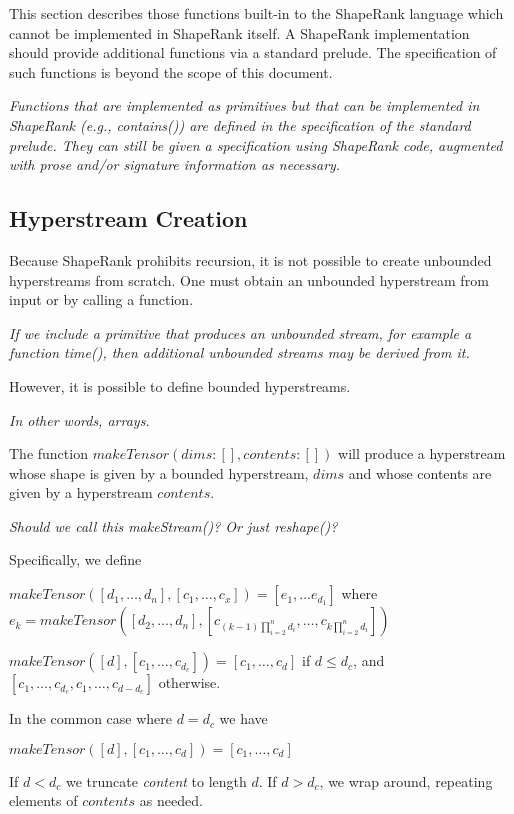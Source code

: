 \documentclass{article}
\begin{document}
This section describes those functions built-in to the ShapeRank language which cannot be implemented in ShapeRank itself. A ShapeRank implementation should provide additional functions via a standard prelude. The specification of such functions is beyond the scope of this document. 

{\em
Functions that are implemented as primitives but that can be implemented in
ShapeRank (e.g., contains()) are defined in the specification of the standard prelude. They can still be given a specification using ShapeRank code, augmented with prose
and/or signature information as necessary.
}

\subsection{Hyperstream Creation}
\label{streamCreation}

Because ShapeRank prohibits recursion, it is not possible to create unbounded hyperstreams from scratch. One must obtain an unbounded hyperstream from input or by calling a function.

{\em
If we include a primitive that produces an unbounded stream, for example a function {\em time()}, then additional
unbounded streams may be derived from it.
}

However, it is possible to define bounded hyperstreams.

{\em In other words, arrays.}

The function $makeTensor(dims: [], contents: [])$
will produce a hyperstream whose shape is given by a bounded hyperstream, $dims$ and whose contents are given by a hyperstream $contents$.

{\em
Should we call this makeStream()? Or just reshape()?
}

Specifically, we define

$makeTensor([d_1, \ldots, d_n], [c_1, \ldots, c_x]) = [e_1, \ldots e_{d_1}]$ where  
\newline 
$e_k  = makeTensor([d_2, \ldots, d_n], [c_{(k -1)\prod_{i=2}^{n} d_i}, \ldots, c_{k\prod_{i=2}^{n}d_i}])$

$makeTensor([d], [c_1, \ldots, c_{d_c}]) = [c_1, \ldots, c_d]$ if $d \le d_c$, and $[c_1, \ldots, c_{d_c}, c_1, \ldots, c_{d -d_c}]$ otherwise.

{\em 

In the common case where $d = d_c$ we have

$makeTensor([d], [c_1, \ldots, c_d]) = [c_1, \ldots, c_d]$

If $d < d_c$ we truncate {\em content} to length $d$.
If $d > d_c$, we wrap around, repeating elements of $contents$ as needed.
}
\end{document}
